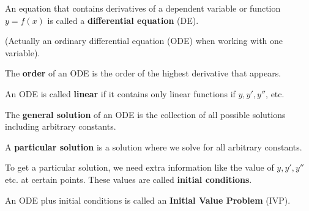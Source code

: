 \documentclass{letter}
\newcommand{\0}[1]{\begin{bmatrix}#1\end{bmatrix}}
\begin{document}
	An equation that contains derivatives of a dependent variable or function $y=f(x)$ is called a \textbf{differential equation} (DE).
	
	(Actually an ordinary differential equation (ODE) when working with one variable).
	
	The \textbf{order} of an ODE is the order of the highest derivative that appears.
	
	An ODE is called \textbf{linear} if it contains only linear functions if $y, y', y''$, etc.
	
	The \textbf{general solution} of an ODE is the collection of all possible solutions including arbitrary constants.
	
	A \textbf{particular solution} is a solution where we solve for all arbitrary constants.
	
	To get a particular solution, we need extra information like the value of $y, y', y''$ etc. at certain points. These values are called \textbf{initial conditions}.
	
	An ODE plus initial conditions is called an \textbf{Initial Value Problem} (IVP).
	
	
\end{document}
